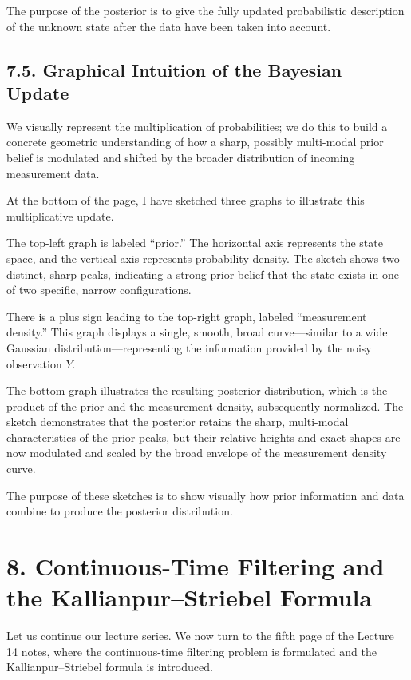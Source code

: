 \documentclass[11pt]{article}
\theoremstyle{definition}
\theoremstyle{remark}
\begin{document}
The purpose of the posterior is to give the fully updated probabilistic description of the unknown state after the data have been taken into account.

\subsection*{7.5. Graphical Intuition of the Bayesian Update}
We visually represent the multiplication of probabilities; we do this to build a concrete geometric understanding of how a sharp, possibly multi-modal prior belief is modulated and shifted by the broader distribution of incoming measurement data.

At the bottom of the page, I have sketched three graphs to illustrate this multiplicative update.

The top-left graph is labeled ``prior.'' The horizontal axis represents the state space, and the vertical axis represents probability density. The sketch shows two distinct, sharp peaks, indicating a strong prior belief that the state exists in one of two specific, narrow configurations.

There is a plus sign leading to the top-right graph, labeled ``measurement density.'' This graph displays a single, smooth, broad curve---similar to a wide Gaussian distribution---representing the information provided by the noisy observation $Y$.

The bottom graph illustrates the resulting posterior distribution, which is the product of the prior and the measurement density, subsequently normalized. The sketch demonstrates that the posterior retains the sharp, multi-modal characteristics of the prior peaks, but their relative heights and exact shapes are now modulated and scaled by the broad envelope of the measurement density curve.

The purpose of these sketches is to show visually how prior information and data combine to produce the posterior distribution.

\section*{8. Continuous-Time Filtering and the Kallianpur--Striebel Formula}
Let us continue our lecture series. We now turn to the fifth page of the Lecture 14 notes, where the continuous-time filtering problem is formulated and the Kallianpur--Striebel formula is introduced.
\end{document}
